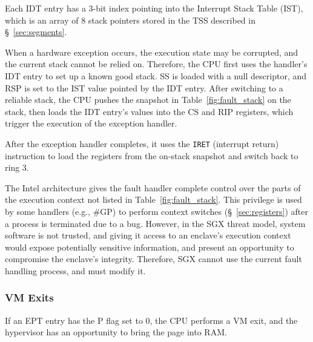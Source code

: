 Each IDT entry has a 3-bit index pointing into the Interrupt Stack Table (IST),
which is an array of 8 stack pointers stored in the TSS described in
\S~\ref{sec:segments}.


When a hardware exception occurs, the execution state may be corrupted, and the
current stack cannot be relied on. Therefore, the CPU first uses the handler's
IDT entry to set up a known good stack. SS is loaded with a null descriptor,
and RSP is set to the IST value pointed by the IDT entry. After switching to a
reliable stack, the CPU pushes the snapshot in Table~\ref{fig:fault_stack} on
the stack, then loads the IDT entry's values into the CS and RIP registers,
which trigger the execution of the exception handler.

\begin{table}[hbt]
  \caption{
    The snapshot pushed on the handler's stack when a hardware exception
    occurs. IRET restores registers from this snapshot.
  }
  \label{fig:fault_stack}
\end{table}

After the exception handler completes, it uses the \texttt{IRET} (interrupt
return) instruction to load the registers from the on-stack snapshot and switch
back to ring 3.

The Intel architecture gives the fault handler complete control over the parts
of the execution context not listed in Table~\ref{fig:fault_stack}. This
privilege is used by some handlers (e.g., \#GP) to perform context switches
(\S~\ref{sec:registers}) after a process is terminated due to a bug. However,
in the SGX threat model, system software is not trusted, and giving it access
to an enclave's execution context would expose potentially sensitive
information, and present an opportunity to compromise the enclave's integrity.
Therefore, SGX cannot use the current fault handling process, and must modify
it.


\subsubsection{VM Exits}
\label{sec:vm_exits}

If an EPT entry has the P flag set to 0, the CPU performs a VM exit, and the
hypervisor has an opportunity to bring the page into RAM.





